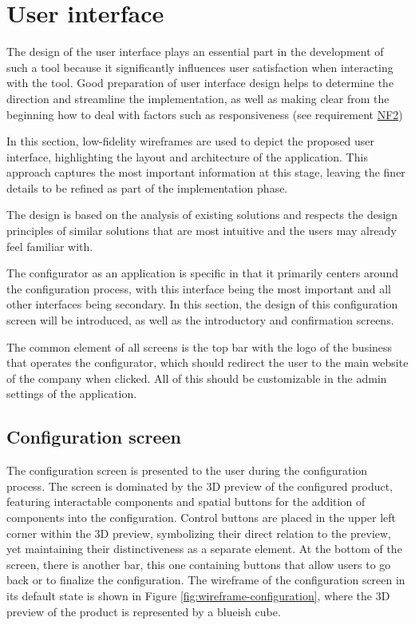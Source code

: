 \section{User interface}

The design of the user interface plays an essential part in the development of such a tool because it significantly influences user satisfaction when interacting with the tool. Good preparation of user interface design helps to determine the direction and streamline the implementation, as well as making clear from the beginning how to deal with factors such as responsiveness (see requirement \hyperref[itm:NF2]{NF2})

In this section, low-fidelity wireframes are used to depict the proposed user interface, highlighting the layout and architecture of the application. This approach captures the most important information at this stage, leaving the finer details to be refined as part of the implementation phase.

The design is based on the analysis of existing solutions and respects the design principles of similar solutions that are most intuitive and the users may already feel familiar with.

The configurator as an application is specific in that it primarily centers around the configuration process, with this interface being the most important and all other interfaces being secondary. In this section, the design of this configuration screen will be introduced, as well as the introductory and confirmation screens.

The common element of all screens is the top bar with the logo of the business that operates the configurator, which should redirect the user to the main website of the company when clicked. All of this should be customizable in the admin settings of the application.

\subsection{Configuration screen}

The configuration screen is presented to the user during the configuration process. The screen is dominated by the 3D preview of the configured product, featuring interactable components and spatial buttons for the addition of components into the configuration. Control buttons are placed in the upper left corner within the 3D preview, symbolizing their direct relation to the preview, yet maintaining their distinctiveness as a separate element. At the bottom of the screen, there is another bar, this one containing buttons that allow users to go back or to finalize the configuration. The wireframe of the configuration screen in its default state is shown in Figure \ref{fig:wireframe-configuration}, where the 3D preview of the product is represented by a blueish cube.

